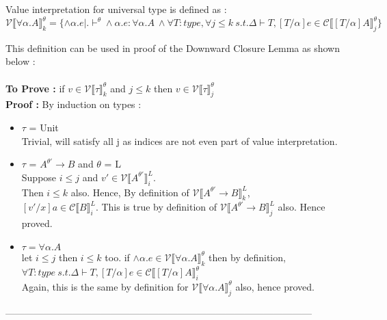 \documentclass[12pt]{article}
\author{Ankit Kumar}
\begin{document}
Value interpretation for universal type is defined as :\\
$$
\mathscr{V} \llbracket \forall \alpha . A \rrbracket_k^{\theta} =
\{\wedge\alpha.e | . \vdash^{\theta} \wedge \alpha .e : \forall \alpha
  . A\ \wedge \forall T:type, \forall j\leq k \ s.t. \Delta \vdash T, [T/\alpha]e \in
  \mathscr{C}\llbracket [T/\alpha]A \rrbracket^{\theta}_j \}
$$ 

This definition can be used in proof of the Downward Closure Lemma as
shown below :\\
\\
\textbf{To Prove :} if $v \in \mathscr{V}\llbracket \tau \rrbracket^{\theta}_k$
and $j \leq k$ then $v \in \mathscr{V}\llbracket \tau
\rrbracket^{\theta}_j$\\
\textbf{Proof :} By induction on types :\\
\begin{itemize}
\item $\tau$ = Unit\\
Trivial, will satisfy all j as indices are not even part of value
interpretation.
\item $\tau$ = $A^{\theta'} \rightarrow B$ and $\theta$ = L\\
Suppose $i \leq j$ and $v' \in \mathscr{V}\llbracket A^{\theta'} \rrbracket^{L}_i$. \\
Then $i \leq k$ also. Hence, By definition of $\mathscr{V} \llbracket
A^{\theta'}  \rightarrow B \rrbracket^{L}_k$,\\
$[v'/x]a \in \mathscr{C}\llbracket B \rrbracket^{L}_i$. This is true
by definition of $\mathscr{V} \llbracket
A^{\theta'}  \rightarrow B \rrbracket^{L}_j$ also. Hence proved.
\item $\tau = \forall \alpha.A$\\
let $i \leq j$ then $ i \leq k$ too.
if $\wedge\alpha.e \in \mathscr{V} \llbracket \forall \alpha . A
\rrbracket_k^{\theta}$ then  by definition, $\forall T:type \ s.t. \Delta \vdash T, [T/\alpha]e \in
  \mathscr{C}\llbracket [T/\alpha]A \rrbracket^{\theta}_i$ \\
Again, this is the same by definition for $\mathscr{V} \llbracket \forall \alpha . A
\rrbracket_j^{\theta}$ also, hence proved.
\end{itemize}
------------------------------------------------------------------------------------------------\\
\end{document}
